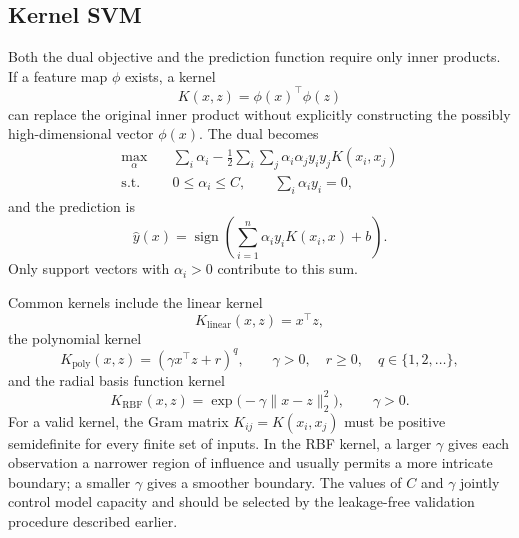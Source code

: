 \subsection{Kernel SVM}

Both the dual objective and the prediction function require only inner
products. If a feature map $\phi$ exists, a kernel
\[
K(x,z)=\phi(x)^\top\phi(z)
\]
can replace the original inner product without explicitly constructing the
possibly high-dimensional vector $\phi(x)$. The dual becomes
\begin{align*}
\max_{\alpha}\quad
&\sum_i\alpha_i
-\frac12\sum_i\sum_j
\alpha_i\alpha_jy_iy_jK(x_i,x_j)\\
\text{s.t.}\quad
&0\le\alpha_i\le C,
\qquad \sum_i\alpha_i y_i=0,
\end{align*}
and the prediction is
\[
\widehat y(x)=\operatorname{sign}
\left(\sum_{i=1}^{n}\alpha_i y_iK(x_i,x)+b\right).
\]
Only support vectors with $\alpha_i>0$ contribute to this sum.

Common kernels include the linear kernel
\[
K_{\mathrm{linear}}(x,z)=x^\top z,
\]
the polynomial kernel
\[
K_{\mathrm{poly}}(x,z)=(\gamma x^\top z+r)^q,
\qquad \gamma>0,\quad r\ge0,\quad q\in\{1,2,\ldots\},
\]
and the radial basis function kernel
\[
K_{\mathrm{RBF}}(x,z)=
\exp\bigl(-\gamma\lVert x-z\rVert_2^2\bigr),
\qquad \gamma>0.
\]
For a valid kernel, the Gram matrix $K_{ij}=K(x_i,x_j)$ must be positive
semidefinite for every finite set of inputs. In the RBF kernel, a larger $\gamma$ gives each observation a
narrower region of influence and usually permits a more intricate boundary; a
smaller $\gamma$ gives a smoother boundary. The values of $C$ and $\gamma$
jointly control model capacity and should be selected by the leakage-free
validation procedure described earlier.
